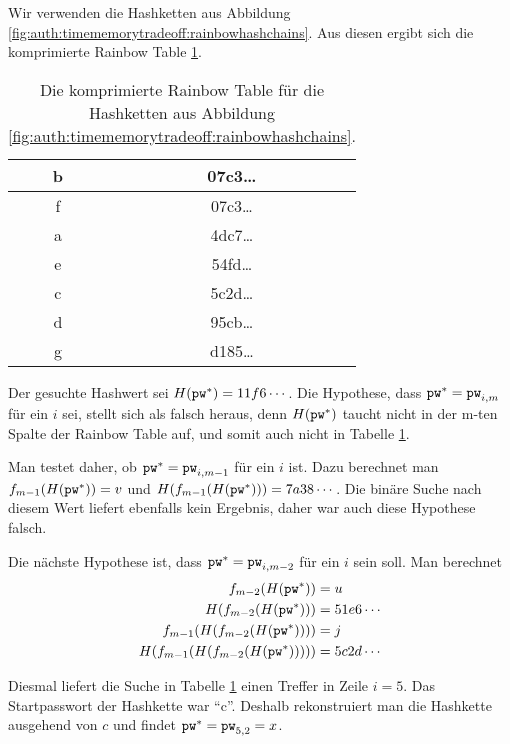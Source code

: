 \begin{beispiel} Wir verwenden die Hashketten aus Abbildung
\ref{fig:auth:timememorytradeoff:rainbowhashchains}. Aus diesen ergibt
sich die komprimierte Rainbow Table \ref{table:auth:rainbowtable}.
	
\begin{table}[h!]
	\begin{center}
		\begin{tabular}{|c|c|} \hline b & 07c3\ldots\\\hline f &
07c3\ldots\\\hline a & 4dc7\ldots\\\hline e & 54fd\ldots\\\hline c &
5c2d\ldots\\\hline d & 95cb\ldots\\\hline g & d185\ldots\\\hline
		\end{tabular}
	\end{center}
	\caption{Die komprimierte Rainbow Table für die Hashketten aus
Abbildung \ref{fig:auth:timememorytradeoff:rainbowhashchains}.}
	\label{table:auth:rainbowtable}
\end{table}

Der gesuchte Hashwert sei $H(\texttt{pw}^*) = 11f6\cdots$.
Die Hypothese, dass $\texttt{pw}^* = \texttt{pw}_{i,m}$ für ein $i$ sei, stellt sich als
falsch heraus, denn $H(\texttt{pw}^*)$ taucht nicht in der m-ten Spalte der
Rainbow Table auf, und somit auch nicht in Tabelle
\ref{table:auth:rainbowtable}. 
	
Man testet daher, ob $\texttt{pw}^* = \texttt{pw}_{i,m-1}$ für ein $i$ ist. Dazu
berechnet man $f_{m-1}(H(\texttt{pw}^*)) = v$ und $H(f_{m-1}(H(\texttt{pw}^*))) =
7a38\cdots$. Die binäre Suche nach diesem Wert liefert ebenfalls kein
Ergebnis, daher war auch diese Hypothese falsch.
	
	Die nächste Hypothese ist, dass $\texttt{pw}^* = \texttt{pw}_{i,m-2}$ für ein
$i$ sein soll.  Man berechnet 
\begin{align*}
f_{m-2}(H(\texttt{pw}^*)) &= u\\
H(f_{m-2}(H(\texttt{pw}^*))) &= 51e6\cdots\\
f_{m-1}(H(f_{m-2}(H(\texttt{pw}^*)))) &= j\\
H(f_{m-1}(H(f_{m-2}(H(\texttt{pw}^*))))) &= 5c2d\cdots  
\end{align*}

 Diesmal liefert die
Suche in Tabelle \ref{table:auth:rainbowtable} einen Treffer in Zeile $i
= 5$. Das Startpasswort der Hashkette war "`c"'. Deshalb rekonstruiert
man die Hashkette ausgehend von $c$ und findet $\texttt{pw}^* = \texttt{pw}_{5,2} =
x$.
\end{beispiel}

